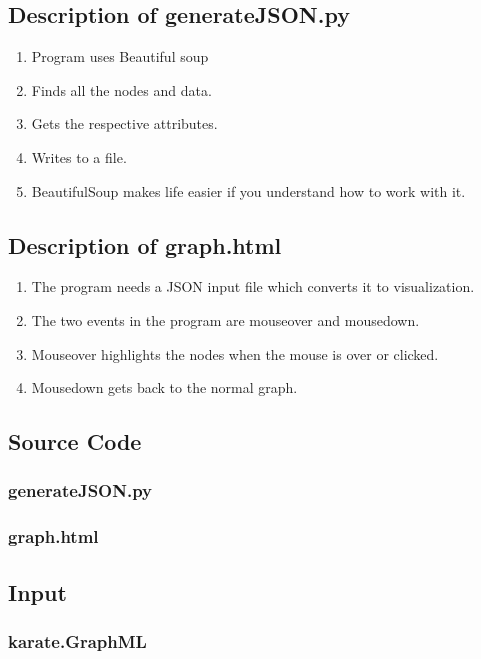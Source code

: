 \documentclass[12pt]{article}
\begin{document}
\subsection{Description of generateJSON.py}
\begin{enumerate}
	\item Program uses Beautiful soup
	\item Finds all the nodes and data.
	\item Gets the respective attributes.
	\item Writes to a file.
	\item BeautifulSoup makes life easier if you understand how to work with it.		 
\end{enumerate}
\subsection{Description of graph.html}
\begin{enumerate}
	\item The program needs a JSON input file which converts it to visualization.
	\item The two events in the program are mouseover and mousedown.
	\item Mouseover highlights the nodes when the mouse is over or clicked.
	\item Mousedown gets back to the normal graph.
\end{enumerate}
 \newpage
\subsection{Source Code}
\subsubsection{generateJSON.py}

\newpage
\subsubsection{graph.html}

\newpage
\subsection{Input}
\subsubsection{karate.GraphML}

\newpage
\end{document}
